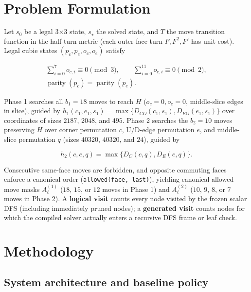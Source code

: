 \documentclass[10pt,twocolumn,letterpaper]{article}
\begin{document}
\hypertarget{problem-formulation}{%
\section{Problem Formulation}\label{problem-formulation}}

Let \(s_0\) be a legal 3×3 state, \(s_\star\) the solved state, and
\(T\) the move transition function in the half-turn metric (each
outer-face turn \(F, F^2, F'\) has unit cost). Legal cubie states
\((p_c, p_e, o_c, o_e)\) satisfy

\[
\begin{gathered}
\sum_{i=0}^{7}o_{c,i}\equiv0\pmod3,\qquad
\sum_{i=0}^{11}o_{e,i}\equiv0\pmod2,\\
\operatorname{parity}(p_c)=\operatorname{parity}(p_e).
\end{gathered}
\tag{1}
\]

Phase 1 searches all \(b_1=18\) moves to reach \(H\) (\(o_c=0, o_e=0\),
middle-slice edges in slice), guided by
\(h_1(c_1,e_1,s_1)=\max\{D_{CO}(c_1,s_1), D_{EO}(e_1,s_1)\}\) over
coordinates of sizes \(2187\), \(2048\), and \(495\). Phase 2 searches
the \(b_2=10\) moves preserving \(H\) over corner permutation \(c\),
U/D-edge permutation \(e\), and middle-slice permutation \(q\) (sizes
\(40320\), \(40320\), and \(24\)), guided by

\[
h_2(c,e,q)=\max\{D_C(c,q),D_E(e,q)\}.
\tag{2}
\]

Consecutive same-face moves are forbidden, and opposite commuting faces
enforce a canonical order (\texttt{allowed(face,\ last)}), yielding
canonical allowed move masks \(A_\ell^{(1)}\) (\(18\), \(15\), or \(12\)
moves in Phase 1) and \(A_\ell^{(2)}\) (\(10\), \(9\), \(8\), or \(7\)
moves in Phase 2). A \textbf{logical visit} counts every node visited by
the frozen scalar DFS (including immediately pruned nodes); a
\textbf{generated visit} counts nodes for which the compiled solver
actually enters a recursive DFS frame or leaf check.

\hypertarget{methodology}{%
\section{Methodology}\label{methodology}}

\hypertarget{system-architecture-and-baseline-policy}{%
\subsection{System architecture and baseline policy}\label{system-architecture-and-baseline-policy}}
\end{document}
